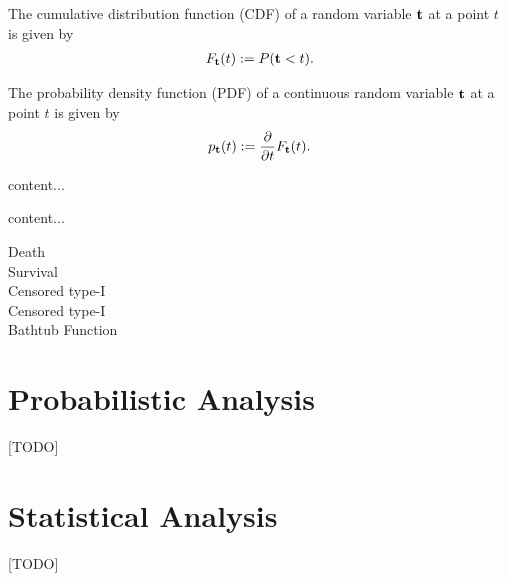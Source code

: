 \begin{definition}[CDF]
The cumulative distribution function (CDF) of a random variable $\mathbf{t}$ at a point $t$  is given by
\begin{align}
	F_{\mathbf{t}}(t):= P(\mathbf{t}<t).
\end{align}
\end{definition}


\begin{definition}[PDF]
The probability density function (PDF) of a continuous random variable $\mathbf{t}$ at a point $t$ is given by 
\begin{align}
	p_{\mathbf{t}}(t):= \frac{\partial}{\partial t}F_{\mathbf{t}}(t).
\end{align}

\end{definition}



\begin{definition}
content...
\end{definition}



\begin{definition}
content...
\end{definition}





\begin{description}
\item [Death]
\item [Survival]
\item [Censored type-I]
\item [Censored type-I]
\item [Bathtub Function]
\end{description}






\section{Probabilistic Analysis}
[TODO]




\section{Statistical Analysis}
[TODO]